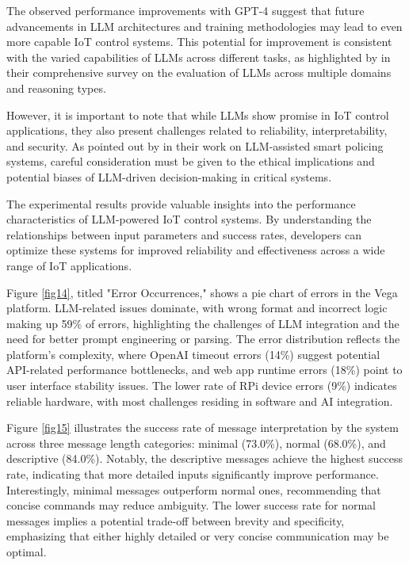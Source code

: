 \documentclass[lettersize,journal]{IEEEtran}
\begin{document}
The observed performance improvements with GPT-4 suggest that future advancements in LLM architectures and training methodologies may lead to even more capable IoT control systems. This potential for improvement is consistent with the varied capabilities of LLMs across different tasks, as highlighted by \citet{10.1145/3641289} in their comprehensive survey on the evaluation of LLMs across multiple domains and reasoning types.

However, it is important to note that while LLMs show promise in IoT control applications, they also present challenges related to reliability, interpretability, and security. As pointed out by \citet{10538107} in their work on LLM-assisted smart policing systems, careful consideration must be given to the ethical implications and potential biases of LLM-driven decision-making in critical systems.

The experimental results provide valuable insights into the performance characteristics of LLM-powered IoT control systems. By understanding the relationships between input parameters and success rates, developers can optimize these systems for improved reliability and effectiveness across a wide range of IoT applications. 


Figure \ref{fig14}, titled "Error Occurrences," shows a pie chart of errors in the Vega platform. LLM-related issues dominate, with wrong format and incorrect logic making up 59\% of errors, highlighting the challenges of LLM integration and the need for better prompt engineering or parsing. The error distribution reflects the platform's complexity, where OpenAI timeout errors (14\%) suggest potential API-related performance bottlenecks, and web app runtime errors (18\%) point to user interface stability issues. The lower rate of RPi device errors (9\%) indicates reliable hardware, with most challenges residing in software and AI integration.

Figure \ref{fig15} illustrates the success rate of message interpretation by the system across three message length categories: minimal (73.0\%), normal (68.0\%), and descriptive (84.0\%). Notably, the descriptive messages achieve the highest success rate, indicating that more detailed inputs significantly improve performance. Interestingly, minimal messages outperform normal ones, recommending that concise commands may reduce ambiguity. The lower success rate for normal messages implies a potential trade-off between brevity and specificity, emphasizing that either highly detailed or very concise communication may be optimal. 
\end{document}
